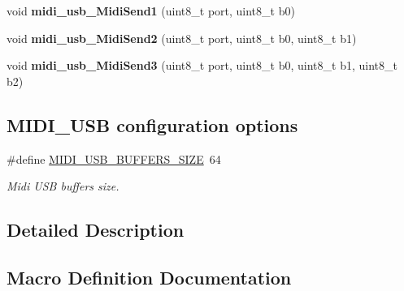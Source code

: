 \begin{DoxyCompactItemize}
\item 
void {\bfseries midi\+\_\+usb\+\_\+\+Midi\+Send1} (uint8\+\_\+t port, uint8\+\_\+t b0)\hypertarget{group__MIDI__USB_gaa1cfc993b446ef02ea5975b846f77179}{}\label{group__MIDI__USB_gaa1cfc993b446ef02ea5975b846f77179}

\item 
void {\bfseries midi\+\_\+usb\+\_\+\+Midi\+Send2} (uint8\+\_\+t port, uint8\+\_\+t b0, uint8\+\_\+t b1)\hypertarget{group__MIDI__USB_ga1e49d72492eab6ec69e52a708ab4c0b5}{}\label{group__MIDI__USB_ga1e49d72492eab6ec69e52a708ab4c0b5}

\item 
void {\bfseries midi\+\_\+usb\+\_\+\+Midi\+Send3} (uint8\+\_\+t port, uint8\+\_\+t b0, uint8\+\_\+t b1, uint8\+\_\+t b2)\hypertarget{group__MIDI__USB_gac7b9522bb4d62b9cd2a62e095a759ff5}{}\label{group__MIDI__USB_gac7b9522bb4d62b9cd2a62e095a759ff5}

\end{DoxyCompactItemize}
\subsection*{M\+I\+D\+I\+\_\+\+U\+SB configuration options}
\begin{DoxyCompactItemize}
\item 
\#define \hyperlink{group__MIDI__USB_ga76b9bd9d7068efe165b409fad9c63fc5}{M\+I\+D\+I\+\_\+\+U\+S\+B\+\_\+\+B\+U\+F\+F\+E\+R\+S\+\_\+\+S\+I\+ZE}~64
\begin{DoxyCompactList}\small\item\em Midi U\+SB buffers size. \end{DoxyCompactList}\end{DoxyCompactItemize}


\subsection{Detailed Description}


\subsection{Macro Definition Documentation}
